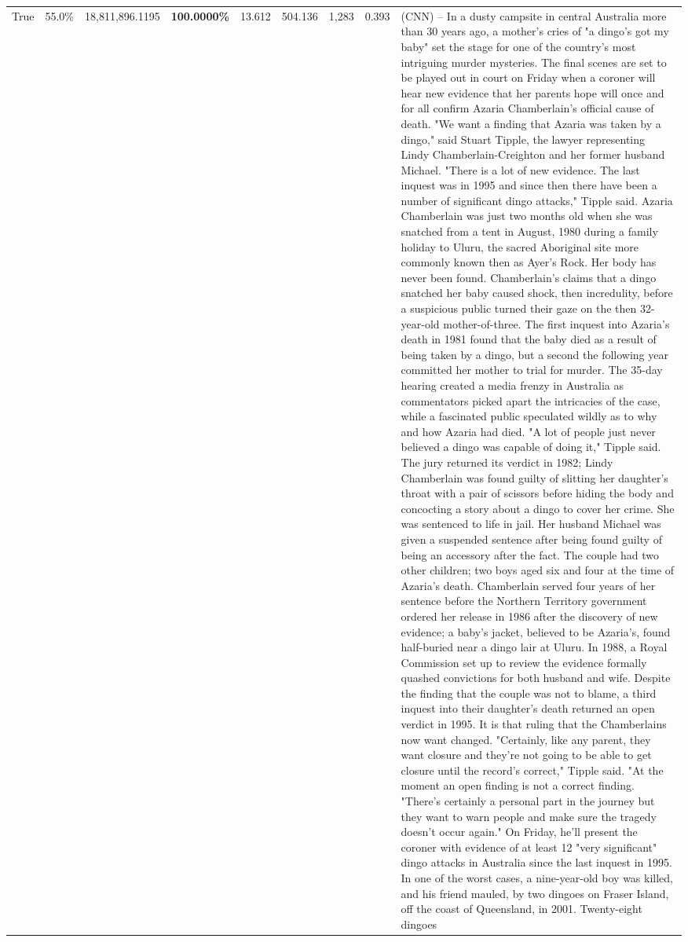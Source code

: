 \begin{table}[H]
\begin{tabular}{lllrlllll}
True & 55.0\% & 18,811,896.1195 & \bfseries \color{red} 100.0000\% & 13.612 & 504.136 & 1,283 & 0.393 & (CNN) -- In a dusty campsite in central Australia more than 30 years ago, a mother's cries of "a dingo's got my baby" set the stage for one of the country's most intriguing murder mysteries. The final scenes are set to be played out in court on Friday when a coroner will hear new evidence that her parents hope will once and for all confirm Azaria Chamberlain's official cause of death. "We want a finding that Azaria was taken by a dingo," said Stuart Tipple, the lawyer representing Lindy Chamberlain-Creighton and her former husband Michael. "There is a lot of new evidence. The last inquest was in 1995 and since then there have been a number of significant dingo attacks," Tipple said. Azaria Chamberlain was just two months old when she was snatched from a tent in August, 1980 during a family holiday to Uluru, the sacred Aboriginal site more commonly known then as Ayer's Rock. Her body has never been found. Chamberlain's claims that a dingo snatched her baby caused shock, then incredulity, before a suspicious public turned their gaze on the then 32-year-old mother-of-three. The first inquest into Azaria's death in 1981 found that the baby died as a result of being taken by a dingo, but a second the following year committed her mother to trial for murder. The 35-day hearing created a media frenzy in Australia as commentators picked apart the intricacies of the case, while a fascinated public speculated wildly as to why and how Azaria had died. "A lot of people just never believed a dingo was capable of doing it," Tipple said. The jury returned its verdict in 1982; Lindy Chamberlain was found guilty of slitting her daughter's throat with a pair of scissors before hiding the body and concocting a story about a dingo to cover her crime. She was sentenced to life in jail. Her husband Michael was given a suspended sentence after being found guilty of being an accessory after the fact. The couple had two other children; two boys aged six and four at the time of Azaria's death. Chamberlain served four years of her sentence before the Northern Territory government ordered her release in 1986 after the discovery of new evidence; a baby's jacket, believed to be Azaria's, found half-buried near a dingo lair at Uluru. In 1988, a Royal Commission set up to review the evidence formally quashed convictions for both husband and wife. Despite the finding that the couple was not to blame, a third inquest into their daughter's death returned an open verdict in 1995. It is that ruling that the Chamberlains now want changed. "Certainly, like any parent, they want closure and they're not going to be able to get closure until the record's correct," Tipple said. "At the moment an open finding is not a correct finding. "There's certainly a personal part in the journey but they want to warn people and make sure the tragedy doesn't occur again." On Friday, he'll present the coroner with evidence of at least 12 "very significant" dingo attacks in Australia since the last inquest in 1995. In one of the worst cases, a nine-year-old boy was killed, and his friend mauled, by two dingoes on Fraser Island, off the coast of Queensland, in 2001. Twenty-eight dingoes 
\end{tabular}
\end{table}
